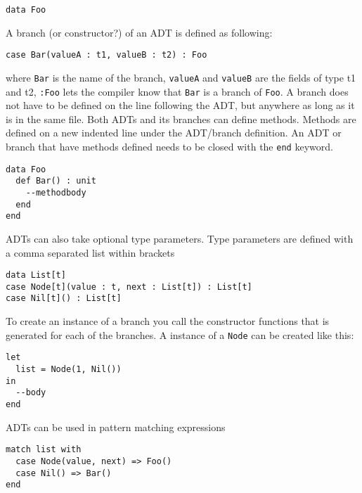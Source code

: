 \documentclass[10pt]{report}
\def\code#1{\texttt{#1}} %
\begin{document}
{\begin{lstlisting}[language=Encore]
data Foo
\end{lstlisting}
A branch (or constructor?) of an ADT is defined as following:
\begin{lstlisting}[language=Encore]
case Bar(valueA : t1, valueB : t2) : Foo
\end{lstlisting}
\par{where \code{Bar} is the name of the branch, \code{valueA} and \code{valueB} are the fields of type t1 and t2, \code{:Foo} lets the compiler know that \code{Bar} is a branch of \code{Foo}.
A branch does not have to be defined on the line following the ADT, but anywhere as long as it is in the same file.
Both ADTs and its branches can define methods. Methods are defined on a new indented line under the ADT/branch definition.
An ADT or branch that have methods defined needs to be closed with the \code{end} keyword.}
\begin{lstlisting}[language=encore,caption={ADT definition with a method}]
data Foo
  def Bar() : unit
    --methodbody
  end
end
\end{lstlisting}
\par{ADTs can also take optional type parameters. Type parameters are defined with a comma separated list within brackets}
\begin{lstlisting}[language=encore,caption={Generic linked list implemented with an ADT}]
data List[t]
case Node[t](value : t, next : List[t]) : List[t]
case Nil[t]() : List[t]
\end{lstlisting}
\par{To create an instance of a branch you call the constructor functions that is generated for each of the branches.
A instance of a \code{Node} can be created like this:}
\begin{lstlisting}[language=encore,caption={Declaration of a list containing one element}]
let
  list = Node(1, Nil())
in
  --body
end
\end{lstlisting}
\par{ADTs can be used in pattern matching expressions}
\begin{lstlisting}[language=encore,caption={Pattern matching on a linked list}]
match list with
  case Node(value, next) => Foo()
  case Nil() => Bar()
end
\end{lstlisting}
}
\end{document}
